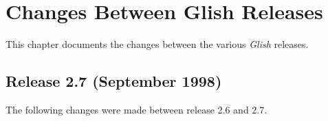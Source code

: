 
\chapter{Changes Between Glish Releases}
\label{changes}

This chapter documents the changes between the various \emph{Glish} releases.


\section{Release 2.7 (September 1998)}

The following changes were made between release 2.6 and 2.7.

